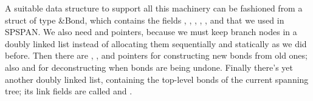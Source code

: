 A suitable data structure to support all this machinery
can be
fashioned from a struct of type \&{Bond}, which contains the fields
, , , , , and %
 that we used in
{\mc SPSPAN}. We also need  and  pointers, because
we
must keep branch nodes in a doubly linked list instead of allocating
them sequentially and statically as we did before. Then there are ,
, and  pointers for constructing new bonds from old
ones;
also  and  for deconstructing when bonds are being
undone.
Finally there's yet another doubly linked list, containing the top-level
bonds of the current spanning tree; its link fields are called  and %
.

